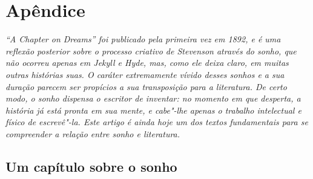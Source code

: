 \begingroup\makeatletter\@openrightfalse
\part{Apêndice}
\thispagestyle{empty}
\mbox{}\vfill
{\noindent\itshape “A Chapter on Dreams” foi publicado pela primeira vez em 1892, 
e é uma reflexão posterior sobre o processo criativo de Stevenson através 
do sonho, que não ocorreu apenas em \emph{Jekyll e Hyde}, mas, como ele deixa 
claro, em muitas outras histórias suas.  O caráter extremamente vívido desses 
sonhos e a sua duração parecem ser propícios a sua transposição para a literatura.  
De certo modo, o sonho dispensa o escritor de inventar: no momento em que desperta, 
a história já está pronta em sua mente, e cabe"-lhe apenas o trabalho intelectual e físico de escrevê"-la.   
Este artigo é ainda hoje um dos textos fundamentais para se compreender a 
relação entre sonho e literatura.}
\@openrighttrue\makeatother\endgroup

\chapter[Um capítulo sobre o sonho\\ \textit{R.L.~Stevenson}]{Um capítulo sobre o sonho}


